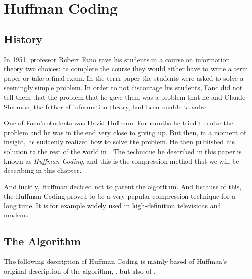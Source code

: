 \begin{comment}
  
\end{comment}


\chapter{Huffman Coding}
\label{cha:huffman}

\section{History}

In 1951, professor Robert Fano gave his students in a course on
information theory two choices: to complete the course they would
either have to write a term paper or take a final exam. In the term
paper the students were asked to solve a seemingly simple problem. In
order to not discourage his students, Fano did not tell them that the
problem that he gave them was a problem that he and Claude Shannon,
the father of information theory, had been unable to
solve\cite{stix91:_profil}.

One of Fano's students was David Huffman. For months he tried to solve
the problem and he was in the end very close to giving up. But then,
in a moment of insight, he suddenly realized how to solve the
problem. He then published his solution to the rest of the world in
\cite{huf52}. The technique he described in this paper is known as
\textit{Huffman Coding}, and this is the compression method that we
will be describing in this chapter.

And luckily, Huffman decided not to patent the algorithm. And because
of this, the Huffman Coding proved to be a very popular compression
technique for a long time. It is for example widely used in
high-definition televisions and modems.

\section{The Algorithm}

The following description of Huffman Coding is mainly based of
Huffman's original description of the algorithm, \cite{huf52}, but
also of
\cite{Salomon:2004:DCC,mark1996data_compression_book,mcfadden92:_hackin_data_compr,mahoney11:_data_compr_explain,Lelewer:1987:DC:45072.45074,cormen2009introduction_to_algo}.

